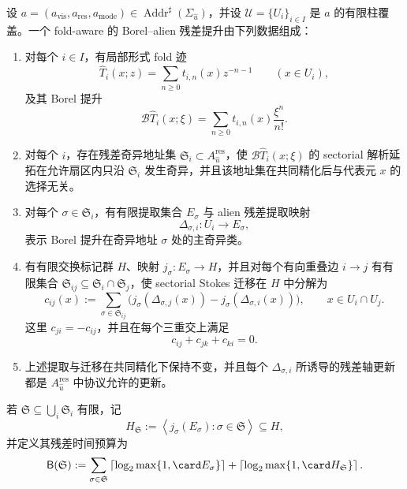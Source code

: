\begin{definition}\label{distill:ecalle_resurgence_mould_calculus_and_alien_derivatives-residual_borel_ledger_theorem-typed-address-borel-alien-lift}
设 \(a=(a_{\mathrm{vis}},a_{\mathrm{res}},a_{\mathrm{mode}})\in
\operatorname{Addr}^{\sharp}(\Sigma_{\hat u})\)，并设
\(\mathcal U=\{U_i\}_{i\in I}\) 是 \(a\) 的有限柱覆盖。一个 fold-aware 的 Borel--alien 残差提升由下列数据组成：
\begin{enumerate}
  \item 对每个 \(i\in I\)，有局部形式 fold 迹
  \[
  \widehat T_i(x;z)=\sum_{n\ge0}t_{i,n}(x)z^{-n-1}\qquad (x\in U_i),
  \]
  及其 Borel 提升
  \[
  \mathscr B\widehat T_i(x;\xi)=\sum_{n\ge0}t_{i,n}(x)\frac{\xi^n}{n!}.
  \]
  \item 对每个 \(i\)，存在残差奇异地址集
  \(\mathfrak S_i\subset A^{\mathrm{res}}_{\hat u}\)，使
  \(\mathscr B\widehat T_i(x;\xi)\) 的 sectorial 解析延拓在允许扇区内只沿
  \(\mathfrak S_i\) 发生奇异，并且该地址集在共同精化后与代表元 \(x\) 的选择无关。
  \item 对每个 \(\sigma\in \mathfrak S_i\)，有有限提取集合 \(E_{\sigma}\) 与 alien 残差提取映射
  \[
  \Delta_{\sigma,i}:U_i\longrightarrow E_{\sigma},
  \]
  表示 Borel 提升在奇异地址 \(\sigma\) 处的主奇异类。
  \item 有有限交换标记群 \(H\)、映射 \(j_{\sigma}:E_{\sigma}\to H\)，并且对每个有向重叠边
  \(i\to j\) 有有限集合
  \(\mathfrak S_{ij}\subseteq \mathfrak S_i\cap\mathfrak S_j\)，使 sectorial Stokes 迁移在 \(H\) 中分解为
  \[
  c_{ij}(x):=\sum_{\sigma\in\mathfrak S_{ij}}
  \bigl(j_{\sigma}(\Delta_{\sigma,j}(x))-j_{\sigma}(\Delta_{\sigma,i}(x))\bigr),
  \qquad x\in U_i\cap U_j.
  \]
  这里 \(c_{ji}=-c_{ij}\)，并且在每个三重交上满足
  \[
  c_{ij}+c_{jk}+c_{ki}=0.
  \]
  \item 上述提取与迁移在共同精化下保持不变，并且每个
  \(\Delta_{\sigma,i}\) 所诱导的残差轴更新都是 \(A^{\mathrm{res}}_{\hat u}\) 中协议允许的更新。
\end{enumerate}
若 \(\mathfrak S\subseteq \bigcup_i\mathfrak S_i\) 有限，记
\[
H_{\mathfrak S}:=\left\langle j_{\sigma}(E_{\sigma}):\sigma\in\mathfrak S\right\rangle\subseteq H,
\]
并定义其残差时间预算为
\[
\mathsf B(\mathfrak S):=\sum_{\sigma\in\mathfrak S}
\left\lceil\log_2\max\{1,\card E_{\sigma}\}\right\rceil+
\left\lceil\log_2\max\{1,\card H_{\mathfrak S}\}\right\rceil.
\]
\end{definition}

